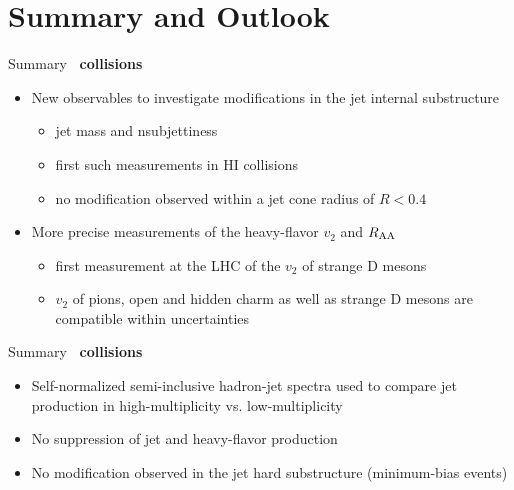 \documentclass[xcolor={usenames,dvipsnames}]{beamer}
\begin{document}
\section{Summary and Outlook}

\begin{frame}{Summary}
\textbf{\PbPb\ collisions}
\begin{itemize}
\item New observables to investigate modifications in the jet internal substructure
\begin{itemize}
\item \alert{jet mass} and \alert{nsubjettiness}
\item first such measurements in HI collisions
\item \alert{no modification} observed within a jet cone radius of $R<0.4$
\end{itemize}
\item More precise measurements of the \alert{heavy-flavor $v_2$ and $R_{\rm AA}$}
\begin{itemize}
\item first measurement at the LHC of the \alert{$v_2$ of strange D mesons}
\item $v_2$ of pions, open and hidden charm as well as strange D mesons are compatible within uncertainties
\end{itemize}
\end{itemize}
\end{frame}
\begin{frame}{Summary}
\textbf{\pPb\ collisions}
\begin{itemize}
\item Self-normalized \alert{semi-inclusive hadron-jet spectra} used to compare jet production in high-multiplicity vs. low-multiplicity
\item \alert{No suppression} of jet and heavy-flavor production
\item \alert{No modification} observed in the jet hard substructure (minimum-bias events)
\end{itemize}
\end{frame}
\end{document}
